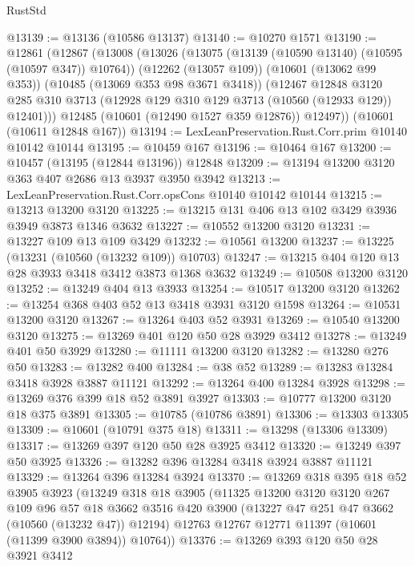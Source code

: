 \begin{lexlean}{RustStd}
\begin{coremodule}
@13139 := @13136 (@10586 @13137)
@13140 := @10270 @1571
@13190 := @12861
    (@12867
      (@13008
        (@13026
          (@13075 (@13139 (@10590 @13140) (@10595 (@10597 @347)) @10764))
          (@12262 (@13057 @109))
          (@10601 (@13062 @99 @353))
          (@10485 (@13069 @353 @98 @3671 @3418))
          (@12467
            @12848
            @3120
            @285
            @310
            @3713
            (@12928 @129 @310 @129 @3713 (@10560 (@12933 @129)) @12401)))
        @12485
        (@10601 (@12490 @1527 @359 @12876))
        @12497))
    (@10601 (@10611 @12848 @167))
@13194 := LexLeanPreservation.Rust.Corr.prim @10140 @10142 @10144
@13195 := @10459 @167
@13196 := @10464 @167
@13200 := @10457 (@13195 (@12844 @13196)) @12848
@13209 := @13194 @13200 @3120 @363 @407 @2686 @13 @3937 @3950 @3942
@13213 := LexLeanPreservation.Rust.Corr.opsCons @10140 @10142 @10144
@13215 := @13213 @13200 @3120
@13225 := @13215 @131 @406 @13 @102 @3429 @3936 @3949 @3873 @1346 @3632
@13227 := @10552 @13200 @3120
@13231 := @13227 @109 @13 @109 @3429
@13232 := @10561 @13200
@13237 := @13225 (@13231 (@10560 (@13232 @109)) @10703)
@13247 := @13215 @404 @120 @13 @28 @3933 @3418 @3412 @3873 @1368 @3632
@13249 := @10508 @13200 @3120
@13252 := @13249 @404 @13 @3933
@13254 := @10517 @13200 @3120
@13262 := @13254 @368 @403 @52 @13 @3418 @3931 @3120 @1598
@13264 := @10531 @13200 @3120
@13267 := @13264 @403 @52 @3931
@13269 := @10540 @13200 @3120
@13275 := @13269 @401 @120 @50 @28 @3929 @3412
@13278 := @13249 @401 @50 @3929
@13280 := @11111 @13200 @3120
@13282 := @13280 @276 @50
@13283 := @13282 @400
@13284 := @38 @52
@13289 := @13283 @13284 @3418 @3928 @3887 @11121
@13292 := @13264 @400 @13284 @3928
@13298 := @13269 @376 @399 @18 @52 @3891 @3927
@13303 := @10777 @13200 @3120 @18 @375 @3891
@13305 := @10785 (@10786 @3891)
@13306 := @13303 @13305
@13309 := @10601 (@10791 @375 @18)
@13311 := @13298 (@13306 @13309)
@13317 := @13269 @397 @120 @50 @28 @3925 @3412
@13320 := @13249 @397 @50 @3925
@13326 := @13282 @396 @13284 @3418 @3924 @3887 @11121
@13329 := @13264 @396 @13284 @3924
@13370 := @13269
    @318
    @395
    @18
    @52
    @3905
    @3923
    (@13249
      @318
      @18
      @3905
      (@11325
        @13200
        @3120
        @3120
        @267
        @109
        @96
        @57
        @18
        @3662
        @3516
        @420
        @3900
        (@13227 @47 @251 @47 @3662 (@10560 (@13232 @47)) @12194)
        @12763
        @12767
        @12771
        @11397
        (@10601 (@11399 @3900 @3894))
        @10764))
@13376 := @13269 @393 @120 @50 @28 @3921 @3412

\end{coremodule}
\end{lexlean}
